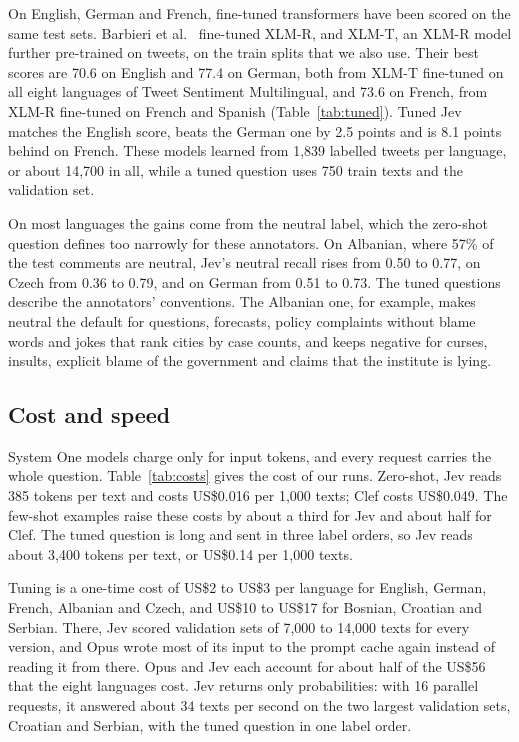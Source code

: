 \documentclass[sigconf]{acmart}
\begin{document}
On English, German and French, fine-tuned transformers have been scored on the same test sets. Barbieri et al.~\cite{barbieri2022xlmt} fine-tuned XLM-R, and XLM-T, an XLM-R model further pre-trained on tweets, on the train splits that we also use. Their best scores are 70.6 on English and 77.4 on German, both from XLM-T fine-tuned on all eight languages of Tweet Sentiment Multilingual, and 73.6 on French, from XLM-R fine-tuned on French and Spanish (Table~\ref{tab:tuned}). Tuned Jev matches the English score, beats the German one by 2.5 points and is 8.1 points behind on French. These models learned from 1,839 labelled tweets per language, or about 14,700 in all, while a tuned question uses 750 train texts and the validation set.

On most languages the gains come from the neutral label, which the zero-shot question defines too narrowly for these annotators. On Albanian, where 57\% of the test comments are neutral, Jev's neutral recall rises from 0.50 to 0.77, on Czech from 0.36 to 0.79, and on German from 0.51 to 0.73. The tuned questions describe the annotators' conventions. The Albanian one, for example, makes neutral the default for questions, forecasts, policy complaints without blame words and jokes that rank cities by case counts, and keeps negative for curses, insults, explicit blame of the government and claims that the institute is lying.

\subsection{Cost and speed}

System One models charge only for input tokens, and every request carries the whole question. Table~\ref{tab:costs} gives the cost of our runs. Zero-shot, Jev reads 385 tokens per text and costs US\$0.016 per 1,000 texts; Clef costs US\$0.049. The few-shot examples raise these costs by about a third for Jev and about half for Clef. The tuned question is long and sent in three label orders, so Jev reads about 3,400 tokens per text, or US\$0.14 per 1,000 texts.

Tuning is a one-time cost of US\$2 to US\$3 per language for English, German, French, Albanian and Czech, and US\$10 to US\$17 for Bosnian, Croatian and Serbian. There, Jev scored validation sets of 7,000 to 14,000 texts for every version, and Opus wrote most of its input to the prompt cache again instead of reading it from there. Opus and Jev each account for about half of the US\$56 that the eight languages cost. Jev returns only probabilities: with 16 parallel requests, it answered about 34 texts per second on the two largest validation sets, Croatian and Serbian, with the tuned question in one label order.
\end{document}
